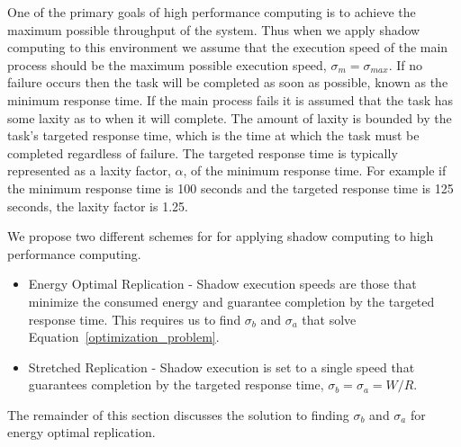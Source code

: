 One of the primary goals of high performance computing is to achieve
the maximum possible throughput of the system. Thus when we
apply shadow computing to this environment we assume that the
execution speed of the main process should be the maximum possible
execution speed, $\sigma_m=\sigma_{max}$. If no failure occurs then
the task will be completed as soon as possible, known as the minimum
response time. If the main process fails it is assumed that the task
has some laxity as to when it will complete. The amount of laxity is
bounded by the task's targeted response time, which is the time at
which the task must be completed regardless of failure. The targeted
response time is typically represented as a laxity factor, $\alpha$,
of the minimum response time. For example if the minimum response time
is 100 seconds and the targeted response time is 125 seconds, the
laxity factor is 1.25.

We propose two different schemes for for applying shadow computing to
high performance computing.
\begin{itemize}
\item 
Energy Optimal Replication - Shadow execution speeds are those that
minimize the consumed energy and guarantee completion by the targeted
response time. This requires us to find $\sigma_b$ and $\sigma_a$ that
solve Equation~\ref{optimization_problem}.
\item 
Stretched Replication - Shadow execution is set to a single speed that
guarantees completion by the targeted response time, $\sigma_b =
\sigma_a = W/R$.
\end{itemize}
The remainder of this section discusses the solution to finding
$\sigma_b$ and $\sigma_a$ for energy optimal replication. 
 

